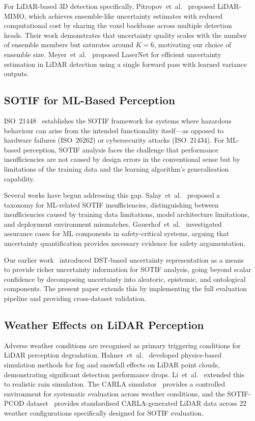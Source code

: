 \documentclass[conference]{IEEEtran}
\begin{document}
For LiDAR-based 3D detection specifically, Pitropov~et~al.~\cite{pitropov2022} proposed LiDAR-MIMO, which achieves ensemble-like uncertainty estimates with reduced computational cost by sharing the voxel backbone across multiple detection heads. Their work demonstrates that uncertainty quality scales with the number of ensemble members but saturates around $K{=}6$, motivating our choice of ensemble size. Meyer~et~al.~\cite{meyer2020} proposed LaserNet for efficient uncertainty estimation in LiDAR detection using a single forward pass with learned variance outputs.

\subsection{SOTIF for ML-Based Perception}

ISO~21448~\cite{iso21448} establishes the SOTIF framework for systems where hazardous behaviour can arise from the intended functionality itself---as opposed to hardware failures (ISO~26262) or cybersecurity attacks (ISO~21434). For ML-based perception, SOTIF analysis faces the challenge that performance insufficiencies are not caused by design errors in the conventional sense but by limitations of the training data and the learning algorithm's generalisation capability.

Several works have begun addressing this gap. Salay~et~al.~\cite{salay2019} proposed a taxonomy for ML-related SOTIF insufficiencies, distinguishing between insufficiencies caused by training data limitations, model architecture limitations, and deployment environment mismatches. Gauerhof~et~al.~\cite{gauerhof2020} investigated assurance cases for ML components in safety-critical systems, arguing that uncertainty quantification provides necessary evidence for safety argumentation.

Our earlier work~\cite{patel2025dst} introduced DST-based uncertainty representation as a means to provide richer uncertainty information for SOTIF analysis, going beyond scalar confidence by decomposing uncertainty into aleatoric, epistemic, and ontological components. The present paper extends this by implementing the full evaluation pipeline and providing cross-dataset validation.

\subsection{Weather Effects on LiDAR Perception}

Adverse weather conditions are recognised as primary triggering conditions for LiDAR perception degradation. Hahner~et~al.~\cite{hahner2021fog,hahner2022snow} developed physics-based simulation methods for fog and snowfall effects on LiDAR point clouds, demonstrating significant detection performance drops. Li~et~al.~\cite{li2023rain} extended this to realistic rain simulation. The CARLA simulator~\cite{dosovitskiy2017} provides a controlled environment for systematic evaluation across weather conditions, and the SOTIF-PCOD dataset~\cite{sotifpcod} provides standardised CARLA-generated LiDAR data across 22 weather configurations specifically designed for SOTIF evaluation.
\end{document}
